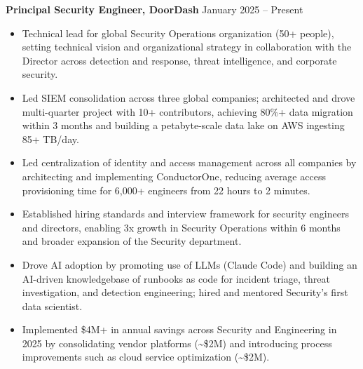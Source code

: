 \documentclass[10pt,letterpaper]{article}
\begin{document}
\textbf{Principal Security Engineer, DoorDash} \hfill January 2025 -- Present
\begin{itemize}
  \item Technical lead for global Security Operations organization (50+ people), setting technical vision and organizational strategy in collaboration with the Director across detection and response, threat intelligence, and corporate security.
  \item Led SIEM consolidation across three global companies; architected and drove multi-quarter project with 10+ contributors, achieving 80\%+ data migration within 3 months and building a petabyte-scale data lake on AWS ingesting 85+ TB/day.
  \item Led centralization of identity and access management across all companies by architecting and implementing \mbox{ConductorOne}, reducing average access provisioning time for 6,000+ engineers from 22 hours to 2 minutes.
  \item Established hiring standards and interview framework for security engineers and directors, enabling 3x growth in Security Operations within 6 months and broader expansion of the Security department.
  \item Drove AI adoption by promoting use of LLMs (Claude Code) and building an AI-driven knowledgebase of runbooks as code for incident triage, threat investigation, and detection engineering; hired and mentored Security's first data scientist.
  \item Implemented \$4M+ in annual savings across Security and Engineering in 2025 by consolidating vendor platforms (\textasciitilde\$2M) and introducing process improvements such as cloud service optimization (\textasciitilde\$2M).
\end{itemize}
\end{document}
